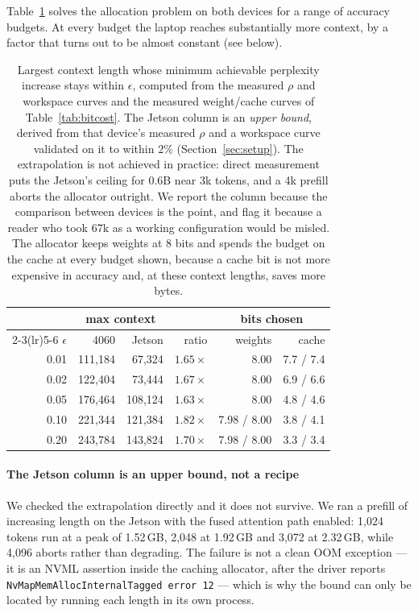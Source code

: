 \documentclass[5p]{elsarticle}
\newcommand{\rhoSym}{\rho}
\begin{document}
Table~\ref{tab:capacity} solves the allocation problem on both devices for a
range of accuracy budgets. At every budget the laptop reaches substantially more
context, by a factor that turns out to be almost constant (see below).

\begin{table}[t]
\centering
\caption{Largest context length whose minimum achievable perplexity increase
stays within $\epsilon$, computed from the measured $\rhoSym$ and workspace
curves and the measured weight/cache curves of Table~\ref{tab:bitcost}. The
Jetson column is an \emph{upper bound}, derived from that device's measured
$\rhoSym$ and a workspace curve validated on it to within $2\%$
(Section~\ref{sec:setup}). The extrapolation is not achieved in practice: direct
measurement puts the Jetson's ceiling for 0.6B near 3k tokens, and a 4k prefill
aborts the allocator outright. We report the column
because the comparison between devices is the point, and flag it because a reader
who took 67k as a working configuration would be misled. The allocator keeps weights at 8 bits
and spends the budget on the cache at every budget shown, because a cache bit is
not more expensive in accuracy and, at these context lengths, saves more bytes.}
\label{tab:capacity}
\begin{tabular}{rrrrrr}
\toprule
& \multicolumn{2}{c}{max context} & & \multicolumn{2}{c}{bits chosen} \\
\cmidrule(lr){2-3}\cmidrule(lr){5-6}
$\epsilon$ & 4060 & Jetson & ratio & weights & cache \\
\midrule
0.01 & 111{,}184 & 67{,}324 & $1.65\times$ & 8.00 & 7.7 / 7.4 \\
0.02 & 122{,}404 & 73{,}444 & $1.67\times$ & 8.00 & 6.9 / 6.6 \\
0.05 & 176{,}464 & 108{,}124 & $1.63\times$ & 8.00 & 4.8 / 4.6 \\
0.10 & 221{,}344 & 121{,}384 & $1.82\times$ & 7.98 / 8.00 & 3.8 / 4.1 \\
0.20 & 243{,}784 & 143{,}824 & $1.70\times$ & 7.98 / 8.00 & 3.3 / 3.4 \\
\bottomrule
\end{tabular}
\end{table}

\paragraph*{The Jetson column is an upper bound, not a recipe}
We checked the extrapolation directly and it does not survive. We ran a prefill of increasing length on the Jetson with the fused attention path
enabled: 1{,}024 tokens run at a peak of 1.52\,GB, 2{,}048 at 1.92\,GB and 3{,}072 at 2.32\,GB, while 4{,}096 aborts rather than degrading. The failure is not a
clean OOM exception --- it is an NVML assertion inside the caching allocator,
after the driver reports \texttt{NvMapMemAllocInternalTagged error 12} --- which is
why the bound can only be located by running each length in its own process.
\end{document}
